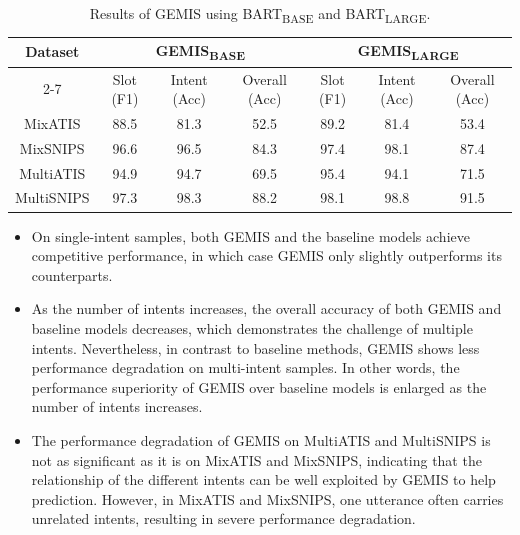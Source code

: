 \documentclass[11pt]{article}
\begin{document}
\begin{table}[ht]
\centering
\caption{Results of GEMIS using BART\textsubscript{BASE} and BART\textsubscript{LARGE}.}
\label{table:bart_base}
\newcommand{\tabincell}[2]{\begin{tabular}{@{}#1@{}}#2\end{tabular}}
\begin{tabular}{c||ccc||ccc}
\hline
\multirow{2}{*}{\textbf{Dataset}} & \multicolumn{3}{c||}{GEMIS\textsubscript{BASE}}      & \multicolumn{3}{c}{GEMIS\textsubscript{LARGE}}      \\ \cline{2-7} 
                         & Slot (F1) & Intent (Acc) & Overall (Acc) & Slot (F1) & Intent (Acc) & Overall (Acc) \\ \hline
MixATIS                  & 88.5     & 81.3        & 52.5         & 89.2     & 81.4        & 53.4         \\
MixSNIPS                 & 96.6     & 96.5        & 84.3         & 97.4     & 98.1        & 87.4         \\
MultiATIS                & 94.9     & 94.7        & 69.5         & 95.4     & 94.1        & 71.5         \\
MultiSNIPS               & 97.3     & 98.3        & 88.2         & 98.1     & 98.8        & 91.5         \\ \hline
\end{tabular}
\end{table}


\begin{itemize}
    \item{On single-intent samples, both GEMIS and the baseline models achieve competitive performance, in which case GEMIS only slightly outperforms its counterparts.}
    \item{As the number of intents increases, the overall accuracy of both GEMIS and baseline models decreases, which demonstrates the challenge of multiple intents. Nevertheless, in contrast to baseline methods, GEMIS shows less performance degradation on multi-intent samples. In other words, the performance superiority of GEMIS over baseline models is enlarged as the number of intents increases.}
    \item{The performance degradation of GEMIS on MultiATIS and MultiSNIPS is not as significant as it is on MixATIS and MixSNIPS, indicating that the relationship of the different intents can be well exploited by GEMIS to help prediction. However, in MixATIS and MixSNIPS, one utterance often carries unrelated intents, resulting in severe performance degradation.}
\end{itemize}
\end{document}
